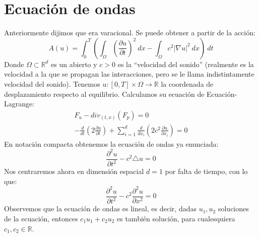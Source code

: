 \section{Ecuación de ondas}
\noindent
Anteriormente dijimos que era varacional. Se puede obtener a partir de la acción:
\begin{equation*}
    A(u) = \int_{0}^{T} \left(\int_{\Omega} {\left(\frac{\partial u}{\partial t}\right)}^{2}~dx - \int_\Omega c^2|\nabla u|^2~dx\right) ~dt 
\end{equation*}
Donde $\Omega\subset \mathbb{R}^d$ es un abierto y $c>0$ es la ``velocidad del sonido'' (realmente es la velocidad a la que se propagan las interacciones, pero se le llama indistintamente velocidad del sonido). Tenemos $u:[0,T]\times \Omega\to \mathbb{R}$ la coordenada de desplazamiento respecto al equilibrio. Calculamos su ecuación de Ecuación-Lagrange:
\begin{gather*}
    F_u - div_{(t,x)}(F_p) = 0 \\
    -\frac{d}{dt}\left(2\frac{\partial u}{\partial t}\right) +\sum_{i=1}^d \frac{d}{dx_i}\left(2c^2\frac{\partial u}{\partial x_i}\right) = 0
\end{gather*}
En notación compacta obtenemos la ecuación de ondas ya enunciada:
\begin{equation*}
    \frac{\partial^2 u}{\partial t^2} - c^2 \triangle u = 0 
\end{equation*}
Nos centraremos ahora en dimensión espacial $d=1$ por falta de tiempo, con lo que:
\begin{equation*}
    \frac{\partial^2 u}{\partial t^2} - c^2 \frac{\partial^2 u}{\partial x^2} = 0
\end{equation*}
Observemos que la ecuación de ondas es lineal, es decir, dadas $u_1,u_2$ soluciones de la ecuación, entonces $c_1u_1 + c_2u_2$ es también solución, para cualesquiera $c_1,c_2\in \mathbb{R}$.\\

